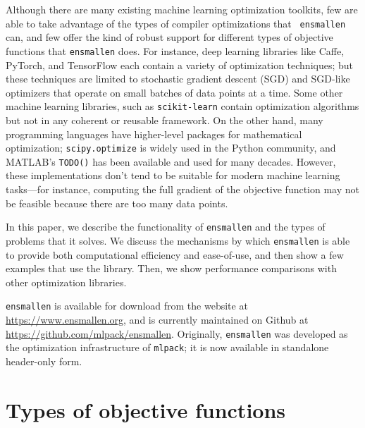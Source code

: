 \documentclass{article}
\begin{document}
Although there are many existing machine learning optimization toolkits, few
are able to take advantage of the types of compiler optimizations that {\tt
ensmallen} can, and few offer the kind of robust support for different types of
objective functions that {\tt ensmallen} does.  For instance, deep learning
libraries like Caffe, %
PyTorch, %
and TensorFlow %
each contain a variety of optimization techniques; but these techniques are
limited to stochastic gradient descent (SGD) and SGD-like optimizers that
operate on small batches of data points at a time.  Some other machine learning
libraries, such as {\tt scikit-learn} %
contain optimization algorithms but not in any coherent or reusable framework.
On the other hand, many programming languages have higher-level packages for
mathematical optimization; {\tt scipy.optimize} %
is widely used in the Python community, and MATLAB's {\tt TODO()}
has been available and used for many decades.  However, these implementations
don't tend to be suitable for modern machine learning tasks---for instance,
computing the full gradient of the objective function may not be feasible
because there are too many data points.

In this paper, we describe the functionality of {\tt ensmallen} and the types of
problems that it solves.  We discuss the mechanisms by which {\tt ensmallen} is
able to provide both computational efficiency and ease-of-use, and then show a
few examples that use the library.  Then, we show performance comparisons with
other optimization libraries.

{\tt ensmallen} is available for download from the website at
\url{https://www.ensmallen.org}, and is currently maintained on Github at
\url{https://github.com/mlpack/ensmallen}.  Originally, {\tt ensmallen} was
developed as the optimization infrastructure of {\tt mlpack}; %
it is now available in standalone header-only form.

\section{Types of objective functions}
\end{document}
